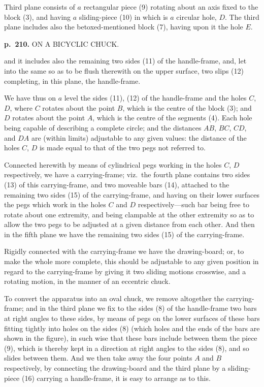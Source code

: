 \documentclass[11pt,a4paper]{book}
\begin{document}
Third plane consists of $a$ rectangular piece (9) rotating about an axis fixed to the block (3), and having $a$ sliding-piece (10) in which is $a$ circular hole, $D$.  The third plane includes also the betoxed-mentioned block (7), having upon it the hole $E$.

\clearpage

\noindent
\textbf{p.~210.}  ON A BICYCLIC CHUCK.

and it includes also the remaining two sides (11) of the handle-frame, and, let into the same so as to be flush therewith on the upper surface, two slips (12) completing, in this plane, the handle-frame.

We have thus on $a$ level the sides (11), (12) of the handle-frame and the holes
$C$, $D$, where $C$ rotates about the point $B$, which is the centre of the block (3); and
$D$ rotates about the point $A$, which is the centre of the segments (4).  Each hole being
capable of describing a complete circle; and the distances $AB$, $BC$, $CD$, and $DA$ are
(within limits) adjustable to any given values: the distance of the holes $C$, $D$ is made
equal to that of the two pegs not referred to.

Connected herewith by means of cylindrical pegs working in the holes $C$, $D$
respectively, we have a carrying-frame; viz.\ the fourth plane contains two sides (13)
of this carrying-frame, and two moveable bars (14), attached to the remaining two
sides (15) of the carrying-frame, and having on their lower surfaces the pegs which
work in the holes $C$ and $D$ respectively---such bar being free to rotate about one
extremity, and being clampable at the other extremity so as to allow the two pegs
to be adjusted at a given distance from each other.  And then in the fifth plane we
have the remaining two sides (15) of the carrying-frame.

Rigidly connected with the carrying-frame we have the drawing-board; or, to make
the whole more complete, this should be adjustable to any given position in regard
to the carrying-frame by giving it two sliding motions crosswise, and a rotating motion,
in the manner of an eccentric chuck.

To convert the apparatus into an oval chuck, we remove altogether the carrying-frame; and in the third plane we fix to the sides (8) of the handle-frame two bars
at right angles to these sides, by means of pegs on the lower surfaces of these bars
fitting tightly into holes on the sides (8) (which holes and the ends of the bars are
shown in the figure), in such wise that these bars include between them the piece
(9), which is thereby kept in a direction at right angles to the sides (8), and so
slides between them.  And we then take away the four points $A$ and $B$ respectively,
by connecting the drawing-board and the third plane by a sliding-piece (16) carrying
a handle-frame, it is easy to arrange as to this.
\end{document}
